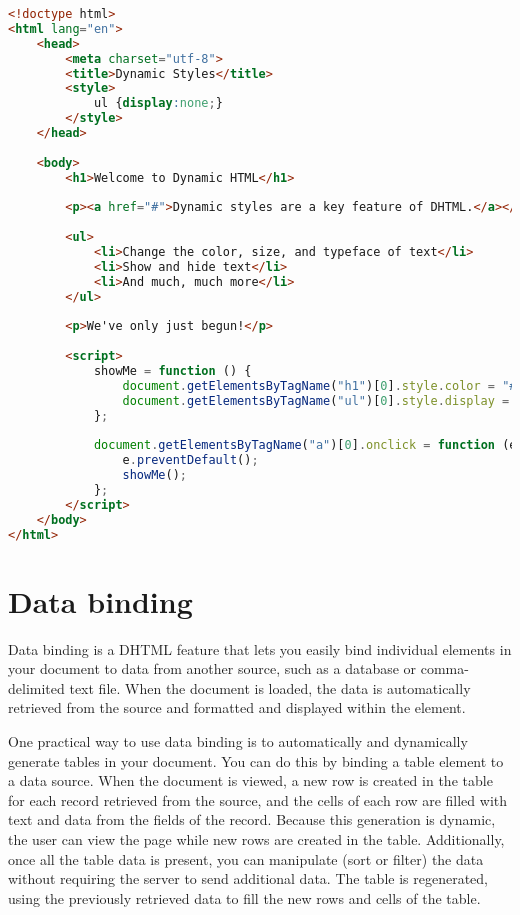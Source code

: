 \begin{lstlisting}[language=HTML]
<!doctype html>
<html lang="en">
    <head>
        <meta charset="utf-8">
        <title>Dynamic Styles</title>
        <style>
            ul {display:none;}
        </style>
    </head>
 
    <body>
        <h1>Welcome to Dynamic HTML</h1>
 
        <p><a href="#">Dynamic styles are a key feature of DHTML.</a></p>
 
        <ul>
            <li>Change the color, size, and typeface of text</li>
            <li>Show and hide text</li>
            <li>And much, much more</li>
        </ul>
 
        <p>We've only just begun!</p>
 
        <script>
            showMe = function () {
                document.getElementsByTagName("h1")[0].style.color = "#990000";
                document.getElementsByTagName("ul")[0].style.display = "block";
            };
 
            document.getElementsByTagName("a")[0].onclick = function (e) {
                e.preventDefault();
                showMe();
            };
        </script>
    </body>
</html>
\end{lstlisting}



\chapter{Data binding}


Data binding is a DHTML feature that lets you easily bind individual elements in your document to data from another source, such as a database or comma-delimited text file. When the document is loaded, the data is automatically retrieved from the source and formatted and displayed within the element.

One practical way to use data binding is to automatically and dynamically generate tables in your document. You can do this by binding a table element to a data source. When the document is viewed, a new row is created in the table for each record retrieved from the source, and the cells of each row are filled with text and data from the fields of the record. Because this generation is dynamic, the user can view the page while new rows are created in the table. Additionally, once all the table data is present, you can manipulate (sort or filter) the data without requiring the server to send additional data. The table is regenerated, using the previously retrieved data to fill the new rows and cells of the table.


